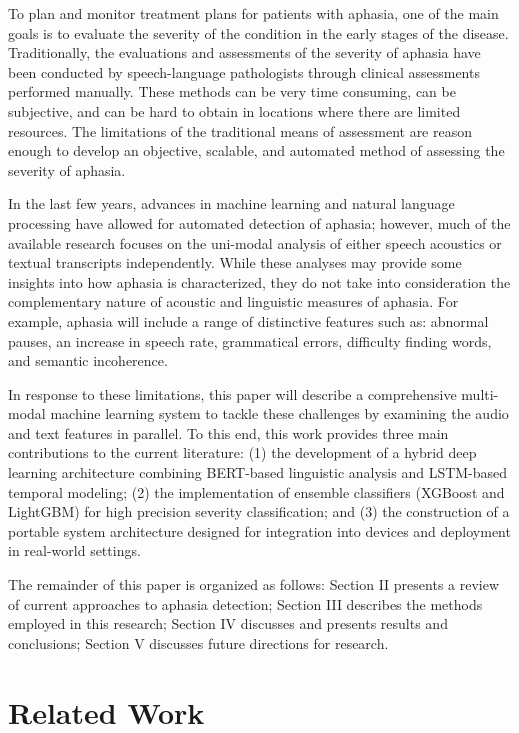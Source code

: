 \documentclass[conference]{IEEEtran}
\begin{document}
To plan and monitor treatment plans for patients with aphasia, one of the main goals is to evaluate the severity of the condition in the early stages of the disease. Traditionally, the evaluations and assessments of the severity of aphasia have been conducted by speech-language pathologists through clinical assessments performed manually. These methods can be very time consuming, can be subjective, and can be hard to obtain in locations where there are limited resources. The limitations of the traditional means of assessment are reason enough to develop an objective, scalable, and automated method of assessing the severity of aphasia.

In the last few years, advances in machine learning and natural language processing have allowed for automated detection of aphasia\cite{rajendran2024conv}; however, much of the available research focuses on the uni-modal analysis of either speech acoustics or textual transcripts independently. While these analyses may provide some insights into how aphasia is characterized, they do not take into consideration the complementary nature of acoustic and linguistic measures of aphasia. For example, aphasia will include a range of distinctive features such as: abnormal pauses, an increase in speech rate, grammatical errors, difficulty finding words, and semantic incoherence\cite{goodglass2001}.

In response to these limitations, this paper will describe a comprehensive multi-modal machine learning system to tackle these challenges by examining the audio and text features in parallel. To this end, this work provides three main contributions to the current literature: (1) the development of a hybrid deep learning architecture combining BERT-based linguistic analysis and LSTM-based temporal modeling; (2) the implementation of ensemble classifiers (XGBoost and LightGBM) for high precision severity classification; and (3) the construction of a portable system architecture designed for integration into devices and deployment in real-world settings.

The remainder of this paper is organized as follows: Section II presents a review of current approaches to aphasia detection; Section III describes the methods employed in this research; Section IV discusses and presents results and conclusions; Section V discusses future directions for research.

\section{Related Work}
\end{document}
